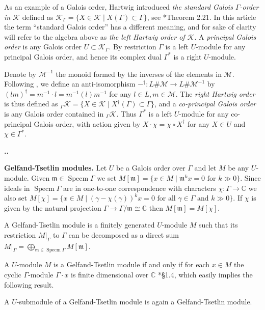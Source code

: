 \documentclass[11pt,fleqn]{amsart}
\renewcommand\thesection{\arabic{section}}
\newcounter{para}[section]
\renewcommand\thepara{\thesection.\arabic{para}}
\def\paragraph{%
 \noindent
 \refstepcounter{para}%
 \textbf{\thepara.}\hspace{1ex}%
}
\newcommand\about[1]{%
 {\bfseries#1.}%
}
\newcommand\CC{\mathbb C}
\renewcommand\to{\longrightarrow}
\newcommand\m{\mathfrak m}
\DeclareMathOperator\Specm{Specm}
\begin{document}
As an example of a Galois order, Hartwig introduced \emph{the standard Galois 
$\Gamma$-order in $\mathcal K$} defined as $\mathcal K_\Gamma = \{X \in 
\mathcal K \mid X(\Gamma) \subset \Gamma\}$, see 
\cite{Hart-rational-galois}*{Theorem 2.21}. In this article the term 
``standard Galois order'' has a different meaning, and for sake of clarity 
will refer to the algebra above as \emph{the left Hartwig order of $\mathcal 
K$}. A \emph{principal Galois order} is any Galois order $U \subset \mathcal 
K_\Gamma$. By restriction $\Gamma$ is a left $U$-module for any principal 
Galois order, and hence its complex dual $\Gamma^*$ is a right $U$-module.

Denote by $\mathcal M^{-1}$ the monoid formed by the inverses of the elements 
in $\mathcal M$. Following \cite{Hart-rational-galois}, we define an 
anti-isomorphism $-^\dagger: L \# \mathcal M \to L \# \mathcal M^{-1}$ by 
$(l m)^\dagger = m^{-1} \cdot l
= m^{-1}(l) m^{-1}$ for any $l \in L, m \in \mathcal M$. The \emph{right 
Hartwig order} is thus defined as ${}_\Gamma \mathcal K = \{X \in \mathcal K
\mid X^\dagger(\Gamma) \subset \Gamma\}$, and a \emph{co-principal Galois 
order} is any Galois order contained in ${}_\Gamma \mathcal K$. Thus $\Gamma^*$
is a left $U$-module for any co-principal Galois order, with action given by 
$X \cdot \chi = \chi \circ X^\dagger$ for any $X \in U$ and $\chi \in 
\Gamma^*$.

\paragraph
\about{Gelfand-Tsetlin modules}\label{par-gt-modules}
Let $U$ be a Galois order over $\Gamma$ and let $M$ be any $U$-module. Given
$\m \in \Specm \Gamma$ we set $M[\m] = \{x \in M \mid \m^k x = 0 \mbox{ for }
k \gg 0\}$. Since ideals in $\Specm \Gamma$ are in one-to-one correspondence 
with characters $\chi: \Gamma \to \CC$ we also set $M[\chi] = \{x \in M \mid 
(\gamma - \chi(\gamma))^k x = 0 \mbox{ for all } \gamma \in \Gamma \mbox{ and 
} k \gg 0\}$. If $\chi$ is given by the natural projection $\Gamma \to \Gamma 
/ \m \cong \CC$ then $M[\m] = M[\chi]$.
\begin{Definition}
A Gelfand-Tsetlin module is a finitely generated $U$-module $M$ such that 
its restriction $M|_\Gamma$ to $\Gamma$ can be decomposed as a direct sum
$M|_\Gamma = \bigoplus_{\m \in \Specm \Gamma} M[\m]$. 
\end{Definition}
A $U$-module $M$ is a Gelfand-Tsetlin module if and only if for each $x \in M$
the cyclic $\Gamma$-module $\Gamma \cdot x$ is finite dimensional over $\CC$
\cite{DFO-GT-modules}*{\S 1.4}, which easily implies the following result. 
\begin{Lemma}
\label{L:sub-gt}
A $U$-submodule of a Gelfand-Tsetlin module is again a Gelfand-Tsetlin module.
\end{Lemma}
\end{document}
